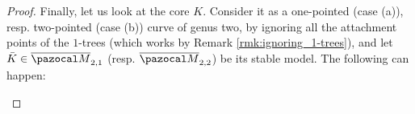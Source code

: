 \documentclass[11pt]{amsart}
\newcommand{\PP}{\mathbb P}
\newcommand{\oM}{\overline{\pazocal M}}
\theoremstyle{plain}
\theoremstyle{definition}
\newtheorem{dfn}[thm]{Definition}
\begin{document}
\begin{proof}

Finally, let us look at the core $K$. Consider it as a one-pointed (case (a)), resp. two-pointed (case (b)) curve of genus two, by ignoring all the attachment points of the $1$-trees (which works by Remark \ref{rmk:ignoring_1-trees}), and let $\bar K\in\oM_{2,1}$ (resp. $\oM_{2,2}$) be its stable model. The following can happen: %
\begin{enumerate}[leftmargin=.6cm]


\end{enumerate}
\end{proof}
\end{document}
